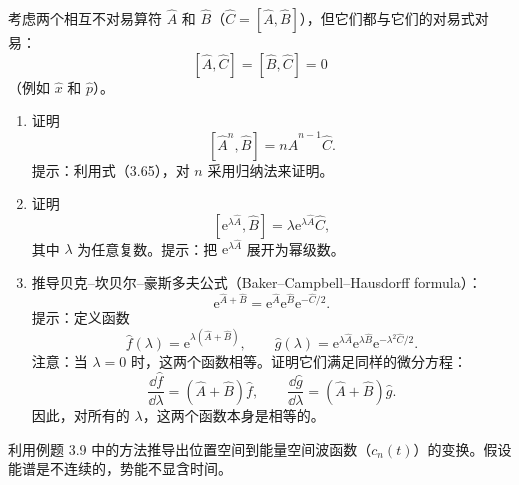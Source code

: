 考虑两个相互不对易算符 $\hat A$ 和 $\hat B$（$\hat C=[\hat A,\hat B]$），但它们都与它们的对易式对易：
\[
[\hat A,\hat C]=[\hat B,\hat C]=0
\]
（例如 $\hat x$ 和 $\hat p$）。
\begin{enumerate}
\item 证明
\[
[\hat A^n,\hat B]=n\hat A^{n-1}\hat C.
\]
提示：利用式（3.65），对 $n$ 采用归纳法来证明。
\item 证明
\[
[\mathrm{e}^{\lambda\hat A},\hat B]
=\lambda\mathrm{e}^{\lambda\hat A}\hat C,
\]
其中 $\lambda$ 为任意复数。提示：把 $\mathrm{e}^{\lambda\hat A}$ 展开为幂级数。
\item 推导贝克--坎贝尔--豪斯多夫公式（Baker--Campbell--Hausdorff formula）：
\[
\mathrm{e}^{\hat A+\hat B}
=\mathrm{e}^{\hat A}\mathrm{e}^{\hat B}\mathrm{e}^{-\hat C/2}.
\]
提示：定义函数
\[
\hat f(\lambda)=\mathrm{e}^{\lambda(\hat A+\hat B)},\qquad
\hat g(\lambda)=\mathrm{e}^{\lambda\hat A}\mathrm{e}^{\lambda\hat B}
\mathrm{e}^{-\lambda^2\hat C/2}.
\]
注意：当 $\lambda=0$ 时，这两个函数相等。证明它们满足同样的微分方程：
\[
\frac{\dd\hat f}{\dd\lambda}=(\hat A+\hat B)\hat f,\qquad
\frac{\dd\hat g}{\dd\lambda}=(\hat A+\hat B)\hat g.
\]
因此，对所有的 $\lambda$，这两个函数本身是相等的。
\end{enumerate}
\vfill

利用例题 3.9 中的方法推导出位置空间到能量空间波函数（$c_n(t)$）的变换。假设能谱是不连续的，势能不显含时间。
\vfill
